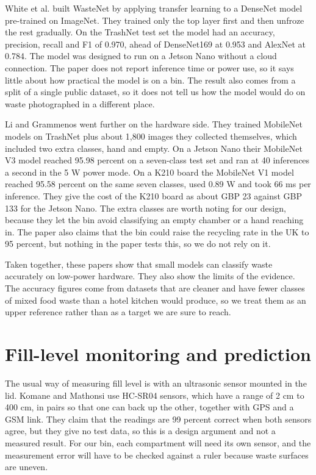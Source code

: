 \documentclass[12pt,a4paper]{report}
\begin{document}
White et al. \cite{white} built WasteNet by applying transfer learning to a DenseNet model pre-trained on ImageNet. They trained only the top layer first and then unfroze the rest gradually. On the TrashNet test set the model had an accuracy, precision, recall and F1 of 0.970, ahead of DenseNet169 at 0.953 and AlexNet at 0.784. The model was designed to run on a Jetson Nano without a cloud connection. The paper does not report inference time or power use, so it says little about how practical the model is on a bin. The result also comes from a split of a single public dataset, so it does not tell us how the model would do on waste photographed in a different place.

Li and Grammenos \cite{li} went further on the hardware side. They trained MobileNet models on TrashNet plus about 1,800 images they collected themselves, which included two extra classes, hand and empty. On a Jetson Nano their MobileNet V3 model reached 95.98 percent on a seven-class test set and ran at 40 inferences a second in the 5 W power mode. On a K210 board the MobileNet V1 model reached 95.58 percent on the same seven classes, used 0.89 W and took 66 ms per inference. They give the cost of the K210 board as about GBP 23 against GBP 133 for the Jetson Nano. The extra classes are worth noting for our design, because they let the bin avoid classifying an empty chamber or a hand reaching in. The paper also claims that the bin could raise the recycling rate in the UK to 95 percent, but nothing in the paper tests this, so we do not rely on it.

Taken together, these papers show that small models can classify waste accurately on low-power hardware. They also show the limits of the evidence. The accuracy figures come from datasets that are cleaner and have fewer classes of mixed food waste than a hotel kitchen would produce, so we treat them as an upper reference rather than as a target we are sure to reach.

\section{Fill-level monitoring and prediction}

The usual way of measuring fill level is with an ultrasonic sensor mounted in the lid. Komane and Mathonsi \cite{komane} use HC-SR04 sensors, which have a range of 2 cm to 400 cm, in pairs so that one can back up the other, together with GPS and a GSM link. They claim that the readings are 99 percent correct when both sensors agree, but they give no test data, so this is a design argument and not a measured result. For our bin, each compartment will need its own sensor, and the measurement error will have to be checked against a ruler because waste surfaces are uneven.
\end{document}
